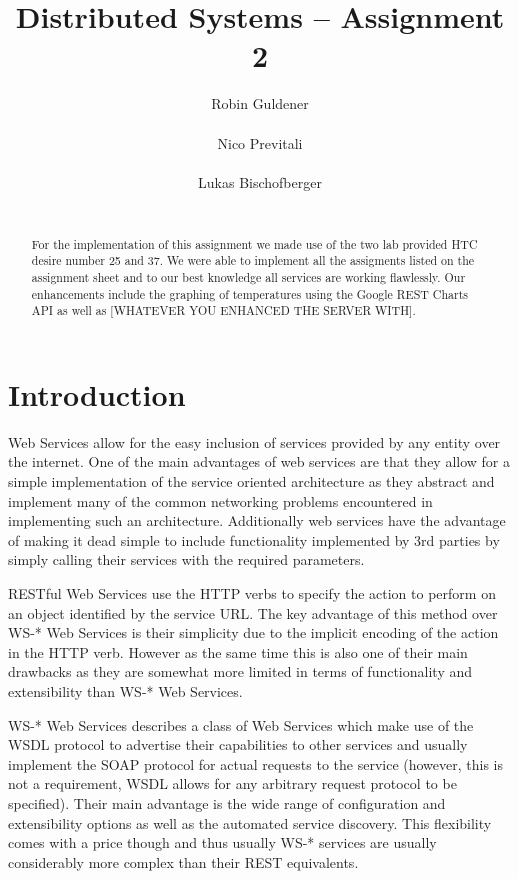 \documentclass{report}
\title{Distributed Systems -- Assignment 2}
\author{
%
%
\alignauthor Robin Guldener\\
	\affaddr{ETH ID 11-930-369}\\
	\email{robing@student.ethz.ch}
\alignauthor Nico Previtali\\
	\affaddr{ETH ID 11-926-433}\\
	\email{pnico@student.ethz.ch}
\alignauthor Lukas Bischofberger\\
	\affaddr{ETH ID 11-915-907}\\
	\email{lukasbi@student.ethz.ch}
}
\begin{document}
\maketitle

\begin{abstract}
For the implementation of this assignment we made use of the two lab provided HTC desire number 25 and 37. We were able to implement all the assigments listed on the assignment sheet and to our best knowledge all services are working flawlessly. Our enhancements include the graphing of temperatures using the Google REST Charts API as well as [WHATEVER YOU ENHANCED THE SERVER WITH].
\end{abstract}

\section{Introduction}

Web Services allow for the easy inclusion of services provided by any entity over the internet. One of the main advantages of web services are that they allow for a simple implementation of the service oriented architecture as they abstract and implement many of the common networking problems encountered in implementing such an architecture. Additionally web services have the advantage of making it dead simple to include functionality implemented by 3rd parties by simply calling their services with the required parameters.

RESTful Web Services use the HTTP verbs to specify the action to perform on an object identified by the service URL. The key advantage of this method over WS\hbox{-}* Web Services is their simplicity due to the implicit encoding of the action in the HTTP verb. However as the same time this is also one of their main drawbacks as they are somewhat more limited in terms of functionality and extensibility than WS\hbox{-}* Web Services.

WS\hbox{-}* Web Services describes a class of Web Services which make use of the WSDL protocol to advertise their capabilities to other services and usually implement the SOAP protocol for actual requests to the service (however, this is not a requirement, WSDL allows for any arbitrary request protocol to be specified). Their main advantage is the wide range of configuration and extensibility options as well as the automated service discovery. This flexibility comes with a price though and thus usually WS\hbox{-}* services are usually considerably more complex than their REST equivalents.
\end{document}
